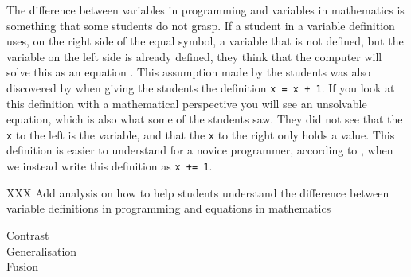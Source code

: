 The difference between variables in programming and variables in 
mathematics is something that some students do not grasp. If a student in a 
variable 
definition uses, on the right side of the equal symbol, a variable that is 
not 
defined, but the variable on the left side is already defined, they think 
that 
the computer will solve this as an equation \parencite{Plass2015Variables}. 
This assumption made by the students was also discovered by 
\textcite{Kohn2017VariableEvaluation} when giving the students the 
definition 
\texttt{x = x + 1}. If you look at this definition with a 
mathematical 
perspective you will see an unsolvable equation, which is also what some of 
the 
students saw. They did not see that the \texttt{x} to the left 
is the 
variable, 
and that the \texttt{x} to the right only holds a value. This 
definition is  
easier to understand for a novice programmer, according to 
\textcite{Kohn2017VariableEvaluation}, when we instead write this 
definition as 
\texttt{x += 1}. 

XXX Add analysis on how to help students understand the difference between 
variable definitions in programming and equations in mathematics

\begin{description}
    \item[Contrast]
    \item[Generalisation]
    \item[Fusion]
\end{description}



